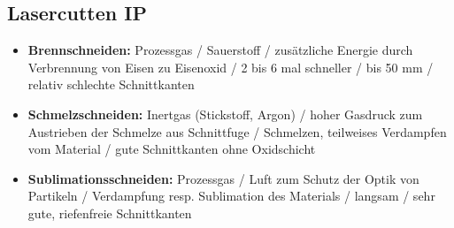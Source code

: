 \subsection{Lasercutten \hfill IP}
    \begin{scriptsize}
        \begin{itemize}
            \item \textbf{Brennschneiden:} Prozessgas / Sauerstoff / zusätzliche Energie durch Verbrennung von Eisen zu Eisenoxid / 2 bis 6 mal schneller / bis 50 mm / relativ schlechte Schnittkanten
            \item \textbf{Schmelzschneiden:} Inertgas (Stickstoff, Argon) / hoher Gasdruck zum Austrieben der Schmelze aus Schnittfuge / Schmelzen, teilweises Verdampfen vom Material / gute Schnittkanten ohne Oxidschicht
            \item \textbf{Sublimationsschneiden:} Prozessgas / Luft zum Schutz der Optik von Partikeln / Verdampfung resp. Sublimation des Materials / langsam / sehr gute, riefenfreie Schnittkanten
        \end{itemize}
    \end{scriptsize}